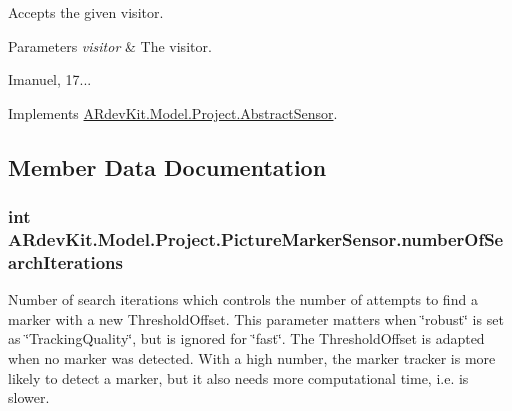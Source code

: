 Accepts the given visitor. 


\begin{DoxyParams}{Parameters}
{\em visitor} & The visitor.\\
\hline
\end{DoxyParams}


Imanuel, 17... 

Implements \hyperlink{class_a_rdev_kit_1_1_model_1_1_project_1_1_abstract_sensor_a4ff825b76bdd9f01a93ca670d02c219c}{A\-Rdev\-Kit.\-Model.\-Project.\-Abstract\-Sensor}.



\subsection{Member Data Documentation}
\hypertarget{class_a_rdev_kit_1_1_model_1_1_project_1_1_picture_marker_sensor_a5a3468a9f180fdb258a72e60a92423ad}{
\subsubsection[{number\-Of\-Search\-Iterations}]{\setlength{\rightskip}{0pt plus 5cm}int A\-Rdev\-Kit.\-Model.\-Project.\-Picture\-Marker\-Sensor.\-number\-Of\-Search\-Iterations\hspace{0.3cm}{\ttfamily [protected]}}}\label{class_a_rdev_kit_1_1_model_1_1_project_1_1_picture_marker_sensor_a5a3468a9f180fdb258a72e60a92423ad}


Number of search iterations which controls the number of attempts to find a marker with a new Threshold\-Offset. This parameter matters when \char`\"{}robust\char`\"{} is set as \char`\"{}\-Tracking\-Quality\char`\"{}, but is ignored for \char`\"{}fast\char`\"{}. The Threshold\-Offset is adapted when no marker was detected. With a high number, the marker tracker is more likely to detect a marker, but it also needs more computational time, i.\-e. is slower. 

